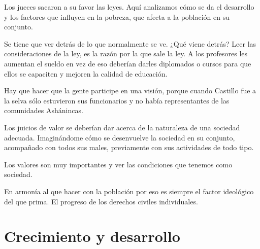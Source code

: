 \documentclass[
  letterpaper,
  DIV=11,
  numbers=noendperiod]{scrartcl}
\begin{document}
Los jueces sacaron a su favor las leyes. Aquí analizamos cómo se da el
desarrollo y los factores que influyen en la pobreza, que afecta a la
población en su conjunto.

Se tiene que ver detrás de lo que normalmente se ve. ¿Qué viene detrás?
Leer las consideraciones de la ley, es la razón por la que sale la ley.
A los profesores les aumentan el sueldo en vez de eso deberían darles
diplomados o cursos para que ellos se capaciten y mejoren la calidad de
educación.

Hay que hacer que la gente participe en una visión, porque cuando
Castillo fue a la selva sólo estuvieron sus funcionarios y no había
representantes de las comunidades Ashánincas.

Los juicios de valor se deberían dar acerca de la naturaleza de una
sociedad adecuada. Imaginándome cómo se desenvuelve la sociedad en su
conjunto, acompañado con todos sus males, previamente con sus
actividades de todo tipo.

Los valores son muy importantes y ver las condiciones que tenemos como
sociedad.

En armonía al que hacer con la población por eso es siempre el factor
ideológico del que prima. El progreso de los derechos civiles
individuales.

\hypertarget{crecimiento-y-desarrollo}{%
\section{Crecimiento y desarrollo}\label{crecimiento-y-desarrollo}}
\end{document}
